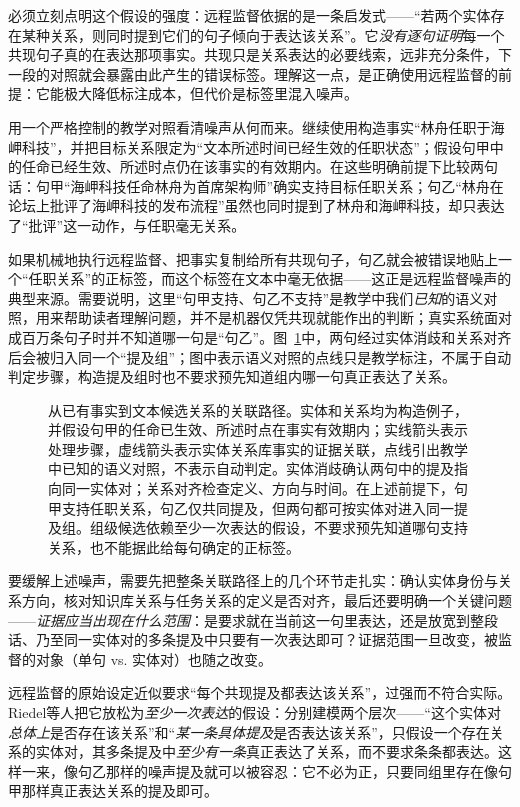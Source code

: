 必须立刻点明这个假设的强度：远程监督依据的是一条启发式——“若两个实体存在某种关系，则同时提到它们的句子倾向于表达该关系”。它\emph{没有逐句证明}每一个共现句子真的在表达那项事实。共现只是关系表达的必要线索，远非充分条件，下一段的对照就会暴露由此产生的错误标签。理解这一点，是正确使用远程监督的前提：它能极大降低标注成本，但代价是标签里混入噪声。

用一个严格控制的教学对照看清噪声从何而来。继续使用构造事实“林舟任职于海岬科技”，并把目标关系限定为“文本所述时间已经生效的任职状态”；假设句甲中的任命已经生效、所述时点仍在该事实的有效期内。在这些明确前提下比较两句话：句甲“海岬科技任命林舟为首席架构师”确实支持目标任职关系；句乙“林舟在论坛上批评了海岬科技的发布流程”虽然也同时提到了林舟和海岬科技，却只表达了“批评”这一动作，与任职毫无关系。

如果机械地执行远程监督、把事实复制给所有共现句子，句乙就会被错误地贴上一个“任职关系”的正标签，而这个标签在文本中毫无依据——这正是远程监督噪声的典型来源。需要说明，这里“句甲支持、句乙不支持”是教学中我们\emph{已知}的语义对照，用来帮助读者理解问题，并不是机器仅凭共现就能作出的判断；真实系统面对成百万条句子时并不知道哪一句是“句乙”。图~\ref{fig:rule-based-knowledge-acquisition-relation-path}中，两句经过实体消歧和关系对齐后会被归入同一个“提及组”；图中表示语义对照的点线只是教学标注，不属于自动判定步骤，构造提及组时也不要求预先知道组内哪一句真正表达了关系。

\begin{figure}[htbp]
  \centering
  
  \caption{从已有事实到文本候选关系的关联路径。实体和关系均为构造例子，并假设句甲的任命已生效、所述时点在事实有效期内；实线箭头表示处理步骤，虚线箭头表示实体关系库事实的证据关联，点线引出教学中已知的语义对照，不表示自动判定。实体消歧确认两句中的提及指向同一实体对；关系对齐检查定义、方向与时间。在上述前提下，句甲支持任职关系，句乙仅共同提及，但两句都可按实体对进入同一提及组。组级候选依赖至少一次表达的假设，不要求预先知道哪句支持关系，也不能据此给每句确定的正标签。}
  \label{fig:rule-based-knowledge-acquisition-relation-path}
\end{figure}

要缓解上述噪声，需要先把整条关联路径上的几个环节走扎实：确认实体身份与关系方向，核对知识库关系与任务关系的定义是否对齐，最后还要明确一个关键问题——\emph{证据应当出现在什么范围}：是要求就在当前这一句里表达，还是放宽到整段话、乃至同一实体对的多条提及中只要有一次表达即可？证据范围一旦改变，被监督的对象（单句 vs. 实体对）也随之改变。

远程监督的原始设定近似要求“每个共现提及都表达该关系”，过强而不符合实际。Riedel等人把它放松为\emph{至少一次表达}的假设：分别建模两个层次——“这个实体对\emph{总体上}是否存在该关系”和“\emph{某一条具体提及}是否表达该关系”，只假设一个存在关系的实体对，其多条提及中\emph{至少有一条}真正表达了关系，而不要求条条都表达。这样一来，像句乙那样的噪声提及就可以被容忍：它不必为正，只要同组里存在像句甲那样真正表达关系的提及即可。

